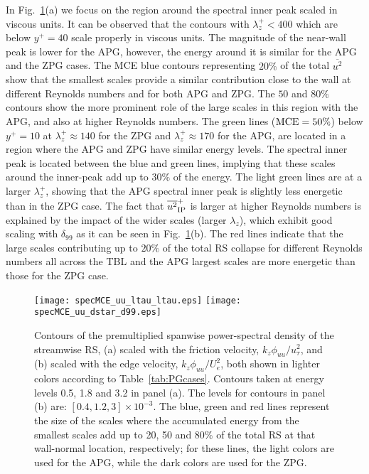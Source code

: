 

In Fig.~\ref{fig:inner_kPSDz}(a) we focus on the region around the spectral inner peak scaled in viscous units.
It can be observed that the contours with $\lambda_z^+ < 400$ which are below $y^+ = 40$ scale properly in viscous units. The magnitude of the near-wall peak is lower for the APG, however, the energy around it is similar for the APG and the ZPG cases.
The MCE blue contours representing $20\%$ of the total $\overline{u^2}$ show that the smallest scales provide a similar contribution close to the wall at different Reynolds numbers and for both APG and ZPG. The $50$ and $80\%$ contours show the more prominent role of the large scales in this region with the APG, and also at higher Reynolds numbers.
The green lines ($\rm MCE=50\%$) below $y^+=10$ at $\lambda_z^+ \approx 140$ for the ZPG and $\lambda_z^+ \approx 170$ for the APG, are located in a region where the APG and ZPG have similar energy levels. The spectral inner peak is located between the blue and green lines, implying that these scales around the inner-peak add up to $30\%$ of the energy. The light green lines are at a larger $\lambda_z^+$, showing that the APG spectral inner peak is slightly less energetic than in the ZPG case. 
The fact that $\overline{u^2}^+_{\rm IP}$ is larger at higher Reynolds numbers is explained by the impact of the wider scales (larger $\lambda_z$), which exhibit good scaling with $\delta_{99}$ as it can be seen in Fig.~\ref{fig:inner_kPSDz}(b). The red lines indicate that the large scales contributing up to $20\%$ of the total RS collapse for different Reynolds numbers all across the TBL and the APG largest scales are more energetic than those for the ZPG case.

\begin{figure}
\texttt{[image: specMCE\_uu\_ltau\_ltau.eps]}
\texttt{[image: specMCE\_uu\_dstar\_d99.eps]}
\caption{ \label{fig:inner_kPSDz} Contours of the premultiplied spanwise power-spectral density of the streamwise RS, (a) scaled with the friction velocity, $k_z\phi_{uu}/u_{\tau}^2$, and (b) scaled with the edge velocity, $k_z\phi_{uu}/U_{e}^2$, both shown in lighter colors according to Table~\ref{tab:PGcases}. Contours taken at energy levels 0.5, 1.8 and 3.2 in panel (a). The levels for contours in panel (b) are: $[0.4, 1.2, 3] \times 10^{-3}$. The blue, green and red lines represent the size of the scales where the accumulated energy from the smallest scales add up to 20, 50 and $80\%$ of the total RS at that wall-normal location, respectively; for these lines, the light colors are used for the APG, while the dark colors are used for the ZPG.}
\end{figure}

